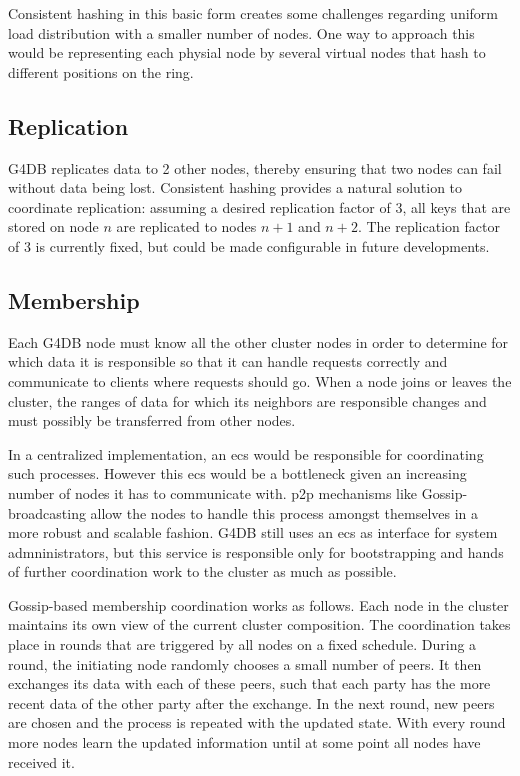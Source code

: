 Consistent hashing in this basic form creates some challenges regarding
uniform load distribution with a smaller number of nodes.
One way to approach this would be representing each physial node by several
virtual nodes that hash to different positions on the ring.

\subsection{Replication}

G4DB replicates data to 2 other nodes, thereby ensuring that two nodes can fail without data
being lost.
Consistent hashing provides a natural solution to coordinate replication:
assuming a desired replication factor of 3, all keys that are stored on node $n$ are replicated
to nodes $n+1$ and $n+2$.
The replication factor of 3 is currently fixed, but could be made configurable in future
developments.

\subsection{Membership}

Each G4DB node must know all the other cluster nodes in order to determine
for which data it is responsible so that it can handle requests correctly
and communicate to clients where requests should go.
When a node joins or leaves the cluster, the ranges of data for which its neighbors
are responsible changes and must possibly be transferred from other nodes.

In a centralized implementation, an \ac{ecs} would be responsible for coordinating
such processes.
However this \ac{ecs} would be a bottleneck given an
increasing number of nodes it has to communicate with.
\ac{p2p} mechanisms like Gossip-broadcasting allow the nodes to handle this process
amongst themselves in a more robust and scalable fashion.
G4DB still uses an \ac{ecs} as interface
for system admninistrators, but this service is responsible only for bootstrapping
and hands of further coordination work to the cluster as much as possible.

Gossip-based membership coordination works as follows.
Each node in the cluster maintains its own view of the current cluster composition.
The coordination takes place in rounds that are triggered by all nodes on a fixed schedule.
During a round, the initiating node randomly chooses a small number of peers.
It then exchanges its data with each of these peers, such that each party
has the more recent data of the other party after the exchange.
In the next round, new peers are chosen and the process is repeated with the updated state.
With every round more nodes learn the updated information until at some point all nodes have received it.

